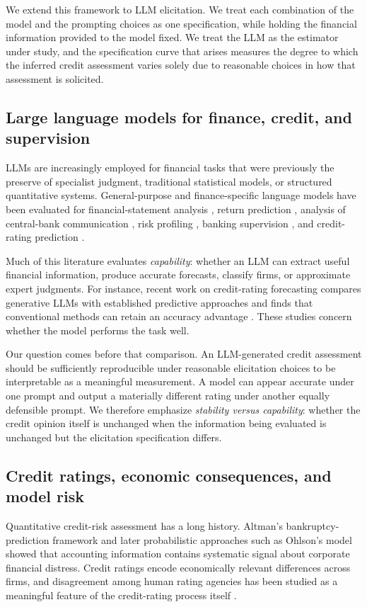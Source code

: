 \documentclass[pdflatex,sn-nature,lineno]{sn-jnl}
\theoremstyle{thmstyleone}
\begin{document}
We extend this framework to LLM elicitation. We treat each combination of the model and the prompting
choices as one specification, while holding the financial information provided to the model fixed. We
treat the LLM as the estimator under study, and the specification curve that arises
measures the degree to which the inferred credit assessment varies solely due to reasonable choices in
how that assessment is solicited.

\subsection{Large language models for finance, credit, and supervision}
LLMs are increasingly employed for financial tasks that were previously the preserve of specialist
judgment, traditional statistical models, or structured quantitative systems. General-purpose
\cite{brown2020gpt3,ouyang2022instruct,achiam2023gpt4} and finance-specific
\cite{wu2023bloomberggpt,xie2023pixiu} language models have been evaluated for financial-statement
analysis \cite{kim2024fsa}, return prediction \cite{lopezlira2023chatgpt}, analysis of central-bank
communication \cite{hansen2024fedspeak}, risk profiling \cite{hens2025risk}, banking supervision
\cite{garciallorente2026banking}, and credit-rating prediction \cite{drinkall2025forecasting}.

Much of this literature evaluates \emph{capability}: whether an LLM can extract useful financial
information, produce accurate forecasts, classify firms, or approximate expert judgments. For instance,
recent work on credit-rating forecasting compares generative LLMs with established predictive approaches
and finds that conventional methods can retain an accuracy advantage \cite{drinkall2025forecasting}.
These studies concern whether the model performs the task well.

Our question comes before that comparison. An LLM-generated credit assessment should be sufficiently
reproducible under reasonable elicitation choices to be interpretable as a meaningful measurement. A
model can appear accurate under one prompt and output a materially different rating under another equally
defensible prompt. We therefore emphasize \emph{stability versus capability}: whether the credit opinion
itself is unchanged when the information being evaluated is unchanged but the elicitation specification
differs.

\subsection{Credit ratings, economic consequences, and model risk}
Quantitative credit-risk assessment has a long history. Altman's bankruptcy-prediction framework
\cite{altman1968} and later probabilistic approaches such as Ohlson's model \cite{ohlson1980} showed that
accounting information contains systematic signal about corporate financial distress. Credit ratings
encode economically relevant differences across firms, and disagreement among human rating agencies has
been studied as a meaningful feature of the credit-rating process itself
\cite{cantorpacker1997,kligersarig2000,tang2009}.
\end{document}
